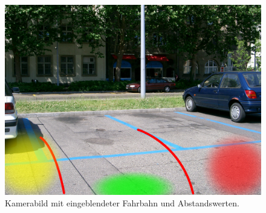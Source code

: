 \documentclass[pflichtenheft.tex]{subfiles}
\begin{document}
\begin{figure}[H]
  	\begin{center}
 		\includegraphics[width=\textwidth]{Images/GUI-BackDrive.jpg}
  		\caption{Kamerabild mit eingeblendeter Fahrbahn und Abstandswerten.}
  	\end{center}
\end{figure}
\end{document}

